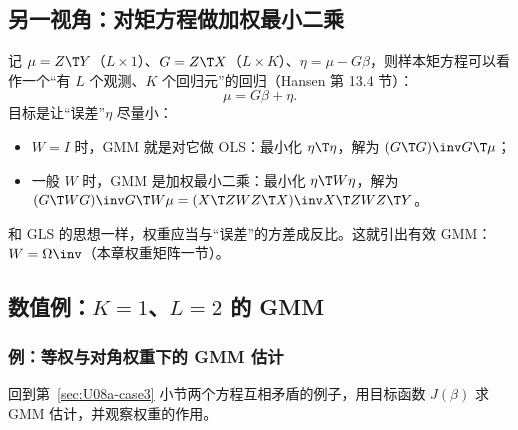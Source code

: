 \subsection{另一视角：对矩方程做加权最小二乘}

记 $\mu=Z\T Y$（$L\times1$）、$G=Z\T X$（$L\times K$）、$\eta=\mu-G\beta$，则样本矩方程可以看作一个“有 $L$ 个观测、$K$ 个回归元”的回归（Hansen 第 13.4 节）：
\[
\mu=G\beta+\eta .
\]
目标是让“误差”$\eta$ 尽量小：
\begin{itemize}
  \item $W=I$ 时，GMM 就是对它做 OLS：最小化 $\eta\T\eta$，解为 $(G\T G)\inv G\T\mu$；
  \item 一般 $W$ 时，GMM 是加权最小二乘：最小化 $\eta\T W\eta$，解为 $(G\T WG)\inv G\T W\mu=(X\T ZWZ\T X)\inv X\T ZWZ\T Y$。
\end{itemize}
和 GLS 的思想一样，权重应当与“误差”的方差成反比。这就引出有效 GMM：$W=\Omega\inv$（本章权重矩阵一节）。

\subsection{数值例：\texorpdfstring{$K=1$、$L=2$}{K=1, L=2} 的 GMM}\label{sec:U08a-gmmnum}

\subsubsection{例：等权与对角权重下的 GMM 估计}

回到第~\ref{sec:U08a-case3} 小节两个方程互相矛盾的例子，用目标函数 $J(\beta)$ 求 GMM 估计，并观察权重的作用。

